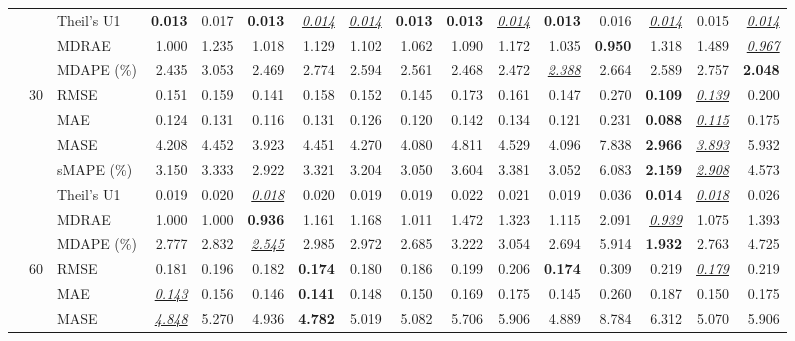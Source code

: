 \begin{table}[!htbp]
{\begin{tabular}{lllrrrrrrrrrrrrr}
 &  & Theil's U1 & \textbf{0.013} & 0.017 & \textbf{0.013} & \underline{\textit{0.014}} & \underline{\textit{0.014}} & \textbf{0.013} & \textbf{0.013} & \underline{\textit{0.014}} & \textbf{0.013} & 0.016 & \underline{\textit{0.014}} & 0.015 & \underline{\textit{0.014}} \\
 &  & MDRAE & 1.000 & 1.235 & 1.018 & 1.129 & 1.102 & 1.062 & 1.090 & 1.172 & 1.035 & \textbf{0.950} & 1.318 & 1.489 & \underline{\textit{0.967}} \\
 &  & MDAPE (\%) & 2.435 & 3.053 & 2.469 & 2.774 & 2.594 & 2.561 & 2.468 & 2.472 & \underline{\textit{2.388}} & 2.664 & 2.589 & 2.757 & \textbf{2.048} \\
\cmidrule(lr){2-16}
 & 30 & RMSE & 0.151 & 0.159 & 0.141 & 0.158 & 0.152 & 0.145 & 0.173 & 0.161 & 0.147 & 0.270 & \textbf{0.109} & \underline{\textit{0.139}} & 0.200 \\
 &  & MAE & 0.124 & 0.131 & 0.116 & 0.131 & 0.126 & 0.120 & 0.142 & 0.134 & 0.121 & 0.231 & \textbf{0.088} & \underline{\textit{0.115}} & 0.175 \\
 &  & MASE & 4.208 & 4.452 & 3.923 & 4.451 & 4.270 & 4.080 & 4.811 & 4.529 & 4.096 & 7.838 & \textbf{2.966} & \underline{\textit{3.893}} & 5.932 \\
 &  & sMAPE (\%) & 3.150 & 3.333 & 2.922 & 3.321 & 3.204 & 3.050 & 3.604 & 3.381 & 3.052 & 6.083 & \textbf{2.159} & \underline{\textit{2.908}} & 4.573 \\
 &  & Theil's U1 & 0.019 & 0.020 & \underline{\textit{0.018}} & 0.020 & 0.019 & 0.019 & 0.022 & 0.021 & 0.019 & 0.036 & \textbf{0.014} & \underline{\textit{0.018}} & 0.026 \\
 &  & MDRAE & 1.000 & 1.000 & \textbf{0.936} & 1.161 & 1.168 & 1.011 & 1.472 & 1.323 & 1.115 & 2.091 & \underline{\textit{0.939}} & 1.075 & 1.393 \\
 &  & MDAPE (\%) & 2.777 & 2.832 & \underline{\textit{2.545}} & 2.985 & 2.972 & 2.685 & 3.222 & 3.054 & 2.694 & 5.914 & \textbf{1.932} & 2.763 & 4.725 \\
\cmidrule(lr){2-16}
 & 60 & RMSE & 0.181 & 0.196 & 0.182 & \textbf{0.174} & 0.180 & 0.186 & 0.199 & 0.206 & \textbf{0.174} & 0.309 & 0.219 & \underline{\textit{0.179}} & 0.219 \\
 &  & MAE & \underline{\textit{0.143}} & 0.156 & 0.146 & \textbf{0.141} & 0.148 & 0.150 & 0.169 & 0.175 & 0.145 & 0.260 & 0.187 & 0.150 & 0.175 \\
 &  & MASE & \underline{\textit{4.848}} & 5.270 & 4.936 & \textbf{4.782} & 5.019 & 5.082 & 5.706 & 5.906 & 4.889 & 8.784 & 6.312 & 5.070 & 5.906 \\

\end{tabular}}
\end{table}
